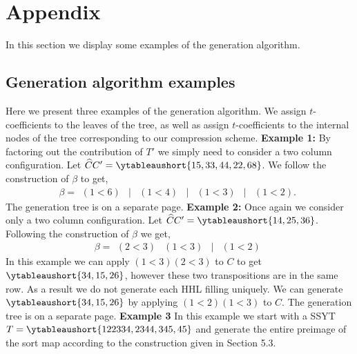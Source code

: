 \documentclass[11pt]{amsart}
\begin{document}
{\section{Appendix}
In this section we display some examples of the generation algorithm.

\subsection{Generation algorithm examples}
Here we present three examples of the generation algorithm. We assign $t$-coefficients to the leaves of the tree, as well as assign $t$-coefficients to the internal nodes of the tree corresponding to our compression scheme.
\newline\textbf{Example 1:} By factoring out the contribution of $T'$ we simply need to consider a two column configuration. Let $\widehat{C}C'=\ytableaushort{15,33,44,22,68}$. We follow the construction of $\beta$ to get, 
\[
\beta=
\begin{matrix}
(1<6)& \big|& (1<4) &\big| & (1<3) &\big| & (1<2).
\end{matrix}
\]
The generation tree is on a separate page.
\newline
\textbf{Example 2: } Once again we consider only a two column configuration. Let $\widehat{C}C'=\ytableaushort{14,25,36}$. Following the construction of $\beta$ we get, 
\[
\beta=
\begin{matrix}
(2<3) & (1<3) & \big| & (1<2)
\end{matrix}
\]
In this example we can apply $(1<3)(2<3)$ to $C$ to get $\ytableaushort{34,15,26}$, however these two transpositions are in the same row. As a result we do not generate each HHL filling uniquely. We can generate $\ytableaushort{34,15,26}$ by applying $(1<2)(1<3)$ to $C$. 
The generation tree is on a separate page. 
\newline
\textbf{Example 3 } In this example we start with a SSYT $T=\ytableaushort{122334,2344,345,45}$ and generate the entire preimage of the sort map according to the construction given in Section 5.3.

}
\end{document}
